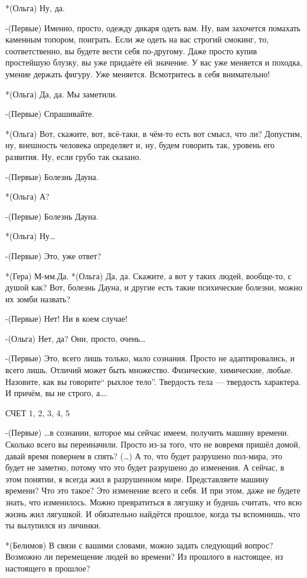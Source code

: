 *(Ольга) Ну, да. 

-(Первые) Именно, просто, одежду дикаря одеть вам. Ну, вам захочется помахать каменным топором, поиграть. Если же одеть на вас строгий смокинг, то, соответственно, вы будете вести себя по-другому. Даже просто купив простейшую блузку, вы уже придаёте ей значение. У вас уже меняется и походка, умение держать фигуру. Уже меняется. Всмотритесь в себя внимательно!

*(Ольга) Да, да. Мы заметили. 

-(Первые) Спрашивайте.

*(Ольга) Вот, скажите, вот, всё-таки, в чём-то есть вот смысл, что ли? Допустим, ну, внешность человека определяет и, ну, будем говорить так, уровень его развития. Ну, если грубо так сказано.

-(Первые) Болезнь Дауна.

*(Ольга) А?

-(Первые) Болезнь Дауна.

*(Ольга) Ну…

-(Первые) Это, уже ответ?

*(Гера) М-мм.Да.
*(Ольга) Да, да. Скажите, а вот у таких людей, вообще-то, с душой как? Вот, болезнь Дауна, и другие есть такие психические болезни, можно их зомби назвать?

-(Первые) Нет! Ни в коем случае!

-(Ольга) Нет, да? Они, просто, очень…

-(Первые) Это, всего лишь только, мало сознания. Просто не адаптировались, и всего лишь. Отличий может быть множество. Физические, химические, любые. Назовите, как вы говорите“ рыхлое тело”. Твердость тела — твердость характера. И причём, вы не строго, а….

СЧЕТ 1, 2, 3, 4, 5

-(Первые) …в сознании, которое мы сейчас имеем, получить машину времени. Сколько всего вы переиначили. Просто из-за того, что не вовремя пришёл домой, давай время повернем в спять? (…) А то, что будет разрушено пол-мира, это будет не заметно, потому что это будет разрушено до изменения. А сейчас, в этом понятии, я всегда жил в разрушенном мире. Представляете машину времени? Что это такое? Это изменение всего и себя. И при этом, даже не будете знать, что изменилось. Можно превратиться в лягушку и будешь считать, что всю жизнь жил лягушкой. И обязательно найдётся прошлое, когда ты вспомнишь, что ты вылупился из личинки.

*(Белимов) В связи с вашими словами, можно задать следующий вопрос? Возможно ли перемещение людей во времени? Из прошлого в настоящее, из настоящего в прошлое?

